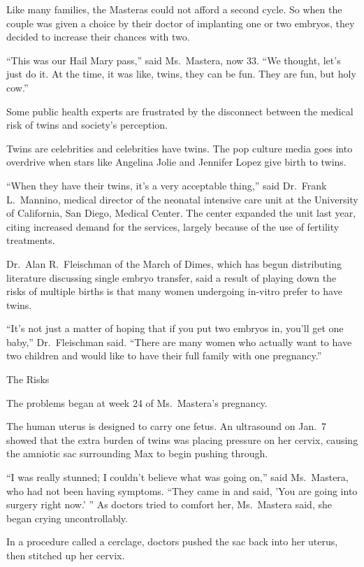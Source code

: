 ﻿\documentclass[12pt]{article}
\begin{document}
Like many families, the Masteras could not afford a second cycle. So when the couple was given a
choice by their doctor of implanting one or two embryos, they decided to increase their chances with
two.

``This was our Hail Mary pass,'' said Ms.~Mastera, now 33. ``We thought, let's just do it. At the
time, it was like, twins, they can be fun. They are fun, but holy cow.''

Some public health experts are frustrated by the disconnect between the medical risk of twins and
society's perception.

Twins are celebrities and celebrities have twins. The pop culture media goes into overdrive when
stars like Angelina Jolie and Jennifer Lopez give birth to twins.

``When they have their twins, it's a very acceptable thing,'' said Dr.~Frank L.~Mannino, medical
director of the neonatal intensive care unit at the University of California, San Diego, Medical
Center. The center expanded the unit last year, citing increased demand for the services, largely
because of the use of fertility treatments.

Dr.~Alan R.~Fleischman of the March of Dimes, which has begun distributing literature discussing
single embryo transfer, said a result of playing down the risks of multiple births is that many
women undergoing in-vitro prefer to have twins.

``It's not just a matter of hoping that if you put two embryos in, you'll get one baby,''
Dr.~Fleischman said. ``There are many women who actually want to have two children and would like to
have their full family with one pregnancy.''

The Risks

The problems began at week 24 of Ms.~Mastera's pregnancy.

The human uterus is designed to carry one fetus. An ultrasound on Jan.~7 showed that the extra
burden of twins was placing pressure on her cervix, causing the amniotic sac surrounding Max to
begin pushing through.

``I was really stunned; I couldn't believe what was going on,'' said Ms.~Mastera, who had not been
having symptoms. ``They came in and said, 'You are going into surgery right now.' '' As doctors
tried to comfort her, Ms.~Mastera said, she began crying uncontrollably.

In a procedure called a cerclage, doctors pushed the sac back into her uterus, then stitched up her
cervix.
\end{document}

